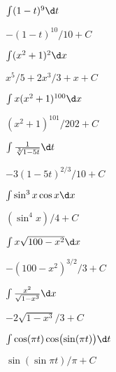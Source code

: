 \begin{exercises}

\twocol

\begin{exercise} $\int (1-t)^9\d t$
\begin{answer} $-(1-t)^{10}/10+C$
\end{answer}\end{exercise}

\begin{exercise} $\int (x^2+1)^2\d x$
\begin{answer} $x^5/5+2x^3/3+x+C$
\end{answer}\end{exercise}

\begin{exercise} $\int x(x^2+1)^{100}\d x$
\begin{answer} $(x^2+1)^{101}/202+C$
\end{answer}\end{exercise}

\begin{exercise} $\int {1\over\root 3 \of {1-5t}}\d t$ 
\begin{answer} $-3(1-5t)^{2/3}/10+C$
\end{answer}\end{exercise}

\begin{exercise} $\int \sin^3x\cos x\d x$
\begin{answer} $(\sin^4x)/4+C$
\end{answer}\end{exercise}

\begin{exercise} $\int x\sqrt{100-x^2}\d x$
\begin{answer} $-(100-x^2)^{3/2}/3+C$
\end{answer}\end{exercise}

\begin{exercise} $\int {x^2\over\sqrt{1-x^3}}\d x$
\begin{answer} $-2\sqrt{1-x^3}/3+C$
\end{answer}\end{exercise}

\begin{exercise} $\int \cos(\pi t)\cos\bigl(\sin(\pi t)\bigr)\d t$
\begin{answer} $\sin(\sin\pi t)/\pi+C$
\end{answer}\end{exercise}


\end{exercises}
